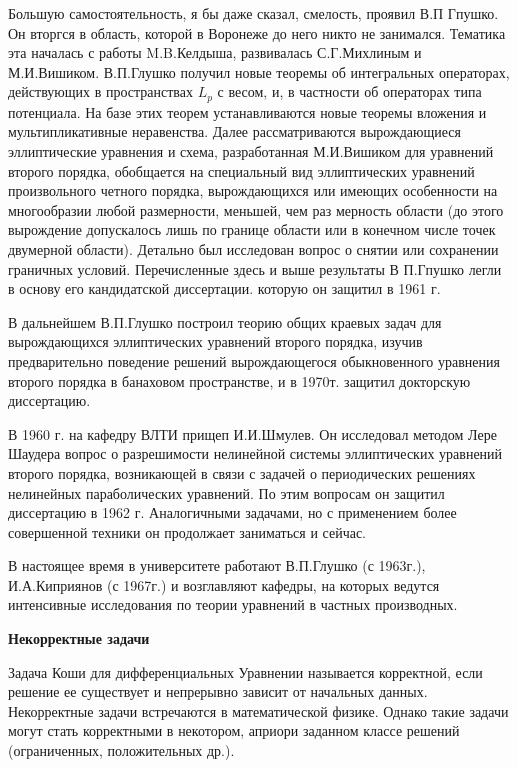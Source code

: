 Большую самостоятельность, я бы даже сказал, смелость, проявил В.П Гпушко. Он вторгся в область, которой в Воронеже до него никто не занимался. Тематика эта началась с работы M.B.Келдыша, развивалась С.Г.Михлиным и М.И.Вишиком. В.П.Глушко получил новые теоремы об интегральных операторах, действующих в пространствах  $L_p$ с весом, и, в частности об операторах типа потенциала. На базе этих теорем устанавливаются новые теоремы вложения и мультипликативные неравенства. Далее рассматриваются вырождающиеся эллиптические уравнения и схема, разработанная М.И.Вишиком для уравнений второго порядка, обобщается на специальный вид эллиптических уравнений произвольного четного порядка, вырождающихся или имеющих особенности на многообразии любой размерности, меньшей, чем раз мерность области (до этого вырождение допускалось лишь по границе области или в конечном числе точек двумерной области). Детально был исследован вопрос о снятии или сохранении граничных условий. Перечисленные здесь и выше результаты В П.Гпушко легли в основу его кандидатской диссертации. которую он защитил в 1961 г.

В дальнейшем В.П.Глушко построил теорию общих краевых задач для вырождающихся эллиптических уравнений второго порядка, изучив предварительно поведение решений вырождающегося обыкновенного уравнения второго порядка в банаховом пространстве, и в 1970т. защитил докторскую диссертацию.

В 1960 г. на кафедру ВЛТИ прищеп И.И.Шмулев. Он исследовал методом Лере Шаудера вопрос о разрешимости нелинейной системы эллиптических уравнений второго порядка, возникающей в связи с задачей о периодических решениях нелинейных параболических уравнений. По этим вопросам он защитил диссертацию в 1962 г. Аналогичными задачами, но с применением более совершенной техники он продолжает заниматься и сейчас.

В настоящее время в университете работают В.П.Глушко (с 1963г.), И.А.Киприянов (с 1967г.) и возглавляют кафедры, на которых ведутся интенсивные исследования по теории уравнений в частных производных.

{\bf Некорректные задачи}

Задача Коши для дифференциальных Уравнении называется корректной, если решение ее существует и непрерывно зависит от начальных данных. Некорректные задачи встречаются в математической физике. Однако такие задачи могут стать корректными в некотором, априори заданном классе решений (ограниченных, положительных др.).

